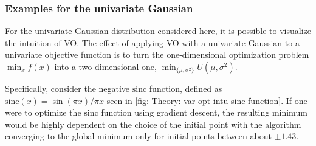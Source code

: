 \subsubsection{Examples for the univariate Gaussian}\label{sec: Variational Optimization: Examples of 1D objective functions optimized with variational optimization}
\providecommand{\sinc}{{\text{sinc}}}
For the univariate Gaussian distribution considered here, it is possible to visualize the intuition of \gls{VO}. The effect of applying \gls{VO} with a univariate Gaussian to a univariate objective function is to turn the one-dimensional optimization problem $\min_x f(x)$ into a two-dimensional one, $\min_{\{\mu,\sigma^2\}} U(\mu,\sigma^2)$. 

Specifically, consider the negative $\sinc$ function, defined as $\sinc(x) = \sin(\pi x)/\pi x$ seen in \autoref{fig: Theory: var-opt-intu-sinc-function}. If one were to optimize the $\sinc$ function using gradient descent, the resulting minimum would be highly dependent on the choice of the initial point with the algorithm converging to the global minimum only for initial points between about $\pm 1.43$. 
%
%
